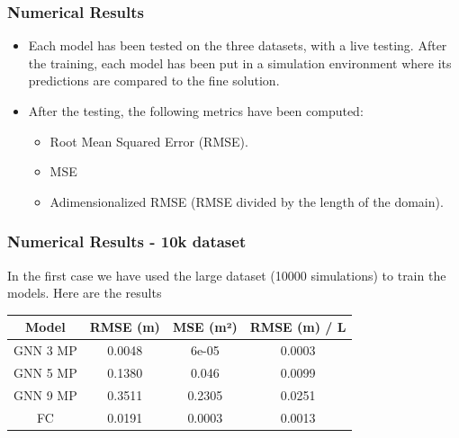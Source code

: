 \documentclass{beamer}
\begin{document}
\begin{frame}
    \frametitle{Numerical Results}
    \begin{itemize}
        \item Each model has been tested on the three datasets, with a live testing. After the training, each model has been put in a simulation environment where its predictions are compared to the fine solution.
        \item After the testing, the following metrics have been computed:
        \begin{itemize}
            \item Root Mean Squared Error (RMSE).
            \item MSE
            \item Adimensionalized RMSE (RMSE divided by the length of the domain).
        \end{itemize}
    \end{itemize}
\end{frame}

\begin{frame}
    \frametitle{Numerical Results - 10k dataset}
    In the first case we have used the large dataset (10000 simulations) to train the models. Here are the results
    \begin{table}
        \centering
        \begin{tabular}{|c|c|c|c|}
            \hline
            Model & RMSE (m) & MSE (m²) & RMSE (m) / L \\
            \hline
            GNN 3 MP & 0.0048 & 6e-05 & 0.0003 \\
            \hline
            GNN 5 MP & 0.1380 & 0.046 & 0.0099 \\
            \hline
            GNN 9 MP & 0.3511 & 0.2305 & 0.0251 \\
            \hline
            FC & 0.0191 & 0.0003 & 0.0013 \\
            \hline
        \end{tabular}
    \end{table}
\end{frame}
\end{document}
